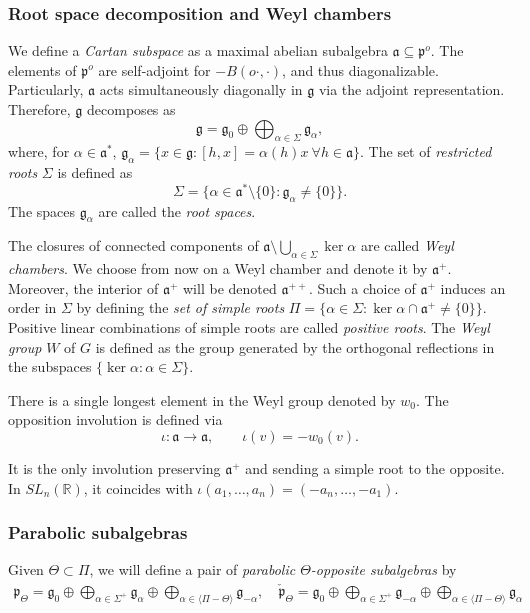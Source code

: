 \documentclass{amsart}
\newcommand{\RR}{\mathbb{R}}
\theoremstyle{remark}
\theoremstyle{definition}
\begin{document}
\subsubsection{Root space decomposition and Weyl chambers}

We define a \emph{Cartan subspace} as a maximal abelian subalgebra $\mathfrak{a} \subseteq \mathfrak{p}^o$.
The elements of $\mathfrak{p}^o$ are self-adjoint for $-B(o\cdot, \cdot)$, and thus diagonalizable. Particularly, $\mathfrak{a}$ acts simultaneously diagonally in $\mathfrak{g}$ via the adjoint representation. Therefore, $\mathfrak{g}$ decomposes as
$$\mathfrak{g} = \mathfrak{g}_0 \oplus \bigoplus_{\alpha \in \Sigma} \mathfrak{g}_\alpha,$$
where, for $\alpha \in \mathfrak{a}^*$, $\mathfrak{g}_\alpha = \{ x \in \mathfrak{g} : [h,x] = \alpha(h) x\: \forall h \in \mathfrak{a}\}.$
The set of \emph{restricted roots} $\Sigma$ is defined as $$\Sigma = \{\alpha \in \mathfrak{a}^* \setminus \{0\} : \mathfrak{g}_\alpha \neq \{0\}\}.$$
The spaces $\mathfrak{g}_\alpha$ are called the \emph{root spaces}.
 

The closures of connected components of
$\mathfrak{a} \setminus \bigcup_{\alpha \in \Sigma} \ker \alpha$ are called \emph{Weyl chambers}. 
We choose from now on a Weyl chamber and denote it by $\mathfrak{a}^+$. 
Moreover, the interior of $\mathfrak{a}^+$ will be denoted $\mathfrak{a}^{++}$.
Such a choice of $\mathfrak{a}^+$ induces an order in $\Sigma$ by defining the \emph{set of simple roots} $\Pi = \{ \alpha \in \Sigma : \ker \alpha \cap \mathfrak{a}^+ \neq \{0\}\}$. Positive linear combinations of simple roots are called \emph{positive roots}.
The \emph{Weyl group} $W$ of $G$ is defined as the group generated by the orthogonal reflections in the subspaces $\{\ker \alpha: \alpha \in \Sigma\}$. 

There is a single longest element in the Weyl group denoted by $w_0$. The opposition involution is defined via
$$\iota: \mathfrak{a} \to \mathfrak{a}, \qquad \iota(v) = -w_0(v).$$

It is the only involution preserving $\mathfrak{a}^+$ and sending a simple root to the opposite. In $SL_n(\RR)$, it coincides with $\iota(a_1, \ldots, a_n) = (-a_n, \ldots, -a_1)$.

\subsubsection{Parabolic subalgebras}

Given $\Theta \subset \Pi$, we will define a pair of \emph{parabolic $\Theta$-opposite subalgebras} by
$$
\begin{aligned}
\mathfrak{p}_\Theta = \mathfrak{g}_0 \oplus \bigoplus_{\alpha \in \Sigma^+} \mathfrak{g}_\alpha \oplus \bigoplus_{\alpha \in \langle \Pi - \Theta \rangle} \mathfrak{g}_{-\alpha}, & \: \check{\mathfrak{p}}_\Theta = \mathfrak{g}_0 \oplus \bigoplus_{\alpha \in \Sigma^+} \mathfrak{g}_{-\alpha} \oplus \bigoplus_{\alpha \in \langle \Pi - \Theta \rangle} \mathfrak{g}_{\alpha}
\end{aligned}
$$
\end{document}
